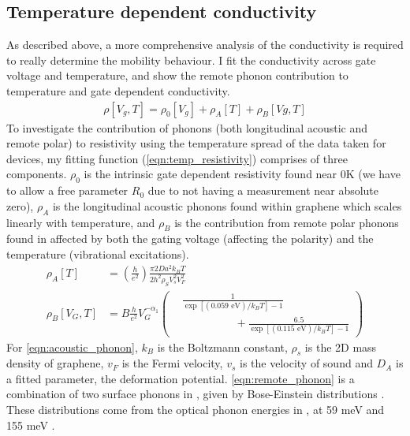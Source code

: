 \documentclass[../Matt_Gebert_Honours_Thesis.tex]{subfiles}
\begin{document}
\subsection{Temperature dependent conductivity}
As described above, a more comprehensive analysis of the conductivity is required to really determine the mobility behaviour. I fit the conductivity across gate voltage and temperature, and show the remote phonon contribution to temperature and gate dependent conductivity.
\begin{align}
\rho[V_g,T] = \rho_0[V_g] + \rho_A[T] + \rho_B[Vg,T] \label{eqn:temp_resistivity}
\end{align}
To investigate the contribution of phonons (both longitudinal acoustic and remote polar) to resistivity using the temperature spread of the data taken for devices, my fitting function (\cref{eqn:temp_resistivity}) comprises of three components. $\rho_0$ is the intrinsic gate dependent resistivity found near 0K (we have to allow a free parameter $R_0$ due to not having a measurement near absolute zero), $\rho_A$ is the longitudinal acoustic phonons found within graphene which scales linearly with temperature, and $\rho_B$ is the contribution from remote polar phonons found in \silicondioxide{} affected by both the gating voltage (affecting the polarity) and the temperature (vibrational excitations).
\begin{align}
\rho_A[T] &= \left(\frac{h}{e^2}\right) \frac{\pi2 Da^2 k_B T}{2 h^2 \rho_S V_s^2 V_F^2}\label{eqn:acoustic_phonon}\\
\rho_B[V_G,T]&= B \frac{h}{e^2} V_G^{-\alpha_1} \left(\begin{aligned}
&\frac{1}{\exp\left[(0.059\text{ eV})/k_B T\right]-1}\\ &\hspace{2cm}+\frac{6.5}{\exp\left[(0.115\text{ eV})/k_B T\right]-1}
\end{aligned}\right)\label{eqn:remote_phonon}
\end{align}
For \cref{eqn:acoustic_phonon}, $k_B$ is the Boltzmann constant, $\rho_s$ is the 2D mass density of graphene, $v_F$ is the Fermi velocity, $v_s$ is the velocity of sound and $D_A$ is a fitted parameter, the deformation potential.
\cref{eqn:remote_phonon} is a combination of two surface phonons in \silicondioxide{}, given by Bose-Einstein distributions \cite{chen_intrinsic_2008}. These distributions come from the optical phonon energies in \silicondioxide{}, at 59 meV and 155 meV \cite{fratini_substrate-limited_2008}.
\end{document}
